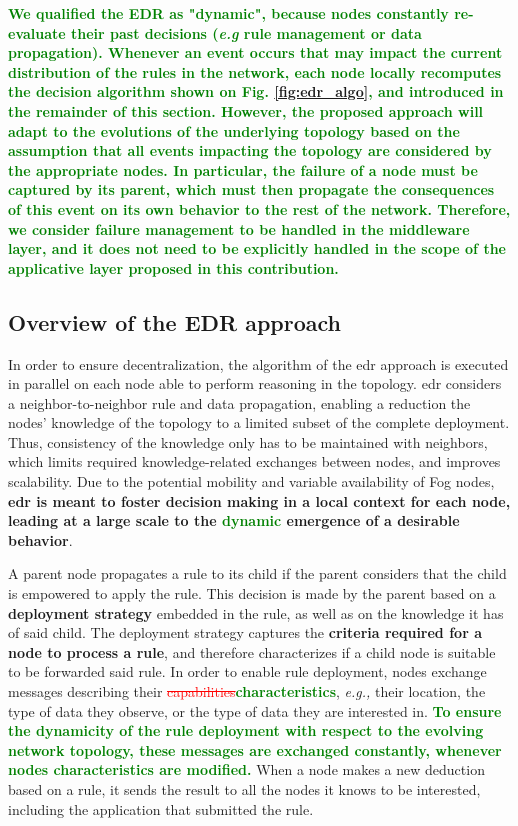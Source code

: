 \documentclass{iosart2c}
\newcommand{\edr}{EDR\xspace}
\newcommand{\added}[1]{\textcolor{green}{\textbf{#1}}}
\newcommand{\removed}[1]{\textcolor{red}{\sout{#1}}}
\begin{document}
\added{We qualified the \edr as "dynamic", because nodes constantly re-evaluate their past decisions (\textit{e.g} rule management or data propagation). 
Whenever an event occurs that may impact the current distribution of the rules in the network, each node locally recomputes the decision algorithm shown on Fig. \ref{fig:edr_algo}, and introduced in the remainder of this section.
However, the proposed approach will adapt to the evolutions of the underlying topology based on the assumption that all events impacting the topology are considered by the appropriate nodes.
In particular, the failure of a node must be captured by its parent, which must then propagate the consequences of this event on its own behavior to the rest of the network.
Therefore, we consider failure management to be handled in the middleware layer, and it does not need to be explicitly handled in the scope of the applicative layer proposed in this contribution.
}

\subsection{Overview of the EDR approach}
\label{subs:edr_overview}

In order to ensure decentralization, the algorithm of the \gls{edr} approach is executed in parallel on each node able to perform reasoning in the topology. 
\gls{edr} considers a neighbor-to-neighbor rule and data propagation, enabling a reduction the nodes' knowledge of the topology to a limited subset of the complete deployment. 
Thus, consistency of the knowledge only has to be maintained with neighbors, which limits required knowledge-related exchanges between nodes, and improves scalability.
Due to the potential mobility and variable availability of Fog nodes, \textbf{\gls{edr} is meant to foster decision making in a local context for each node, leading at a large scale to the \added{dynamic} emergence of a desirable behavior}.

A parent node propagates a rule to its child if the parent considers that the child is empowered to apply the rule.
This decision is made by the parent based on a \textbf{deployment strategy} embedded in the rule, as well as on the knowledge it has of said child.
The deployment strategy captures the \textbf{criteria required for a node to process a rule}, and therefore characterizes if a child node is suitable to be forwarded said rule.
In order to enable rule deployment, nodes exchange messages describing their \removed{capabilities}\added{characteristics}, \textit{e.g.,} their location, the type of data they observe, or the type of data they are interested in.
\added{To ensure the \textbf{dynamicity} of the rule deployment with respect to the \textbf{evolving network topology}, these messages are exchanged constantly, whenever nodes characteristics are modified.}
When a node makes a new deduction based on a rule, it sends the result to all the nodes it knows to be interested, including the application that submitted the rule.
\end{document}
